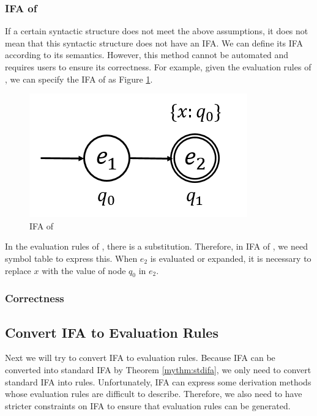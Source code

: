 \subsubsection{IFA of }

If a certain syntactic structure does not meet the above assumptions, it does not mean that this syntactic structure does not have an IFA. We can define its IFA according to its semantics. However, this method cannot be automated and requires users to ensure its correctness. For example, given the evaluation rules of , we can specify the IFA of  as Figure \ref{fig:ifa-let}.


\begin{figure}[t]
    \centering
    \includegraphics[scale=0.3]{images/ifa-let.png}
    \caption{IFA of }
    \label{fig:ifa-let}
\end{figure}

In the evaluation rules of , there is a substitution. Therefore, in IFA of , we need symbol table to express this. When $e_2$ is evaluated or expanded, it is necessary to replace $x$ with the value of node $q_0$ in $e_2$.

\subsubsection{Correctness}



\subsection{Convert IFA to Evaluation Rules}

Next we will try to convert IFA to evaluation rules. Because IFA can be converted into standard IFA by Theorem \ref{mythm:stdifa}, we only need to convert standard IFA into rules. Unfortunately, IFA can express some derivation methods whose evaluation rules are difficult to describe. Therefore, we also need to have stricter constraints on IFA to ensure that evaluation rules can be generated.

